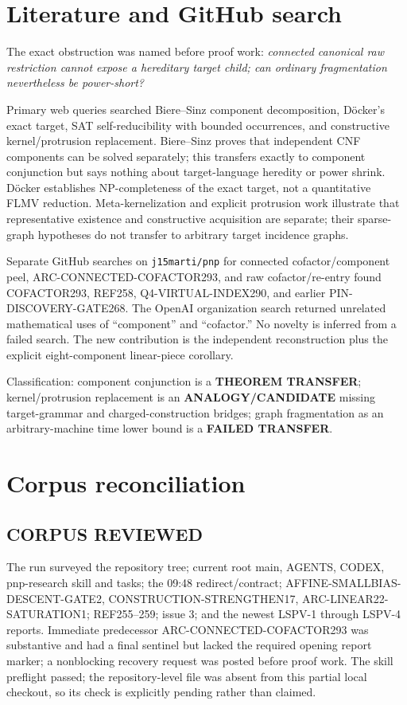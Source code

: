 \documentclass[11pt]{article}
\begin{document}
\section{Literature and GitHub search}
The exact obstruction was named before proof work: \emph{connected canonical raw restriction cannot expose a hereditary target child; can ordinary fragmentation nevertheless be power-short?}

Primary web queries searched Biere--Sinz component decomposition, D\"ocker's exact target, SAT self-reducibility with bounded occurrences, and constructive kernel/protrusion replacement.  Biere--Sinz proves that independent CNF components can be solved separately; this transfers exactly to component conjunction but says nothing about target-language heredity or power shrink.  D\"ocker establishes NP-completeness of the exact target, not a quantitative FLMV reduction.  Meta-kernelization and explicit protrusion work illustrate that representative existence and constructive acquisition are separate; their sparse-graph hypotheses do not transfer to arbitrary target incidence graphs.

Separate GitHub searches on \texttt{j15marti/pnp} for connected cofactor/component peel, ARC-CONNECTED-COFACTOR293, and raw cofactor/re-entry found COFACTOR293, REF258, Q4-VIRTUAL-INDEX290, and earlier PIN-DISCOVERY-GATE268.  The OpenAI organization search returned unrelated mathematical uses of ``component'' and ``cofactor.''  No novelty is inferred from a failed search.  The new contribution is the independent reconstruction plus the explicit eight-component linear-piece corollary.

Classification: component conjunction is a \textbf{THEOREM TRANSFER}; kernel/protrusion replacement is an \textbf{ANALOGY/CANDIDATE} missing target-grammar and charged-construction bridges; graph fragmentation as an arbitrary-machine time lower bound is a \textbf{FAILED TRANSFER}.

\section{Corpus reconciliation}
\subsection*{CORPUS REVIEWED}
The run surveyed the repository tree; current root main, AGENTS, CODEX, pnp-research skill and tasks; the 09:48 redirect/contract; AFFINE-SMALLBIAS-DESCENT-GATE2, CONSTRUCTION-STRENGTHEN17, ARC-LINEAR22-SATURATION1; REF255--259; issue 3; and the newest LSPV-1 through LSPV-4 reports.  Immediate predecessor ARC-CONNECTED-COFACTOR293 was substantive and had a final sentinel but lacked the required opening report marker; a nonblocking recovery request was posted before proof work.  The skill preflight passed; the repository-level  file was absent from this partial local checkout, so its check is explicitly pending rather than claimed.
\end{document}
